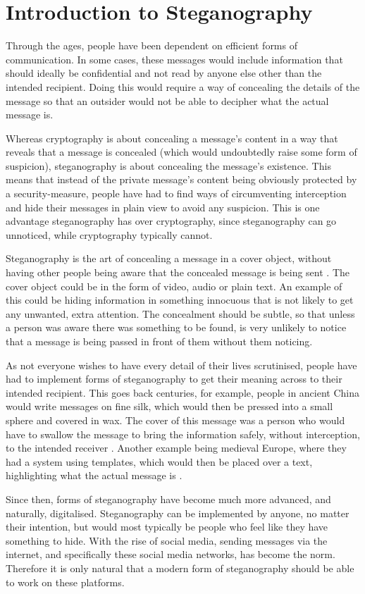 \section{Introduction to Steganography}
Through the ages, people have been dependent on efficient forms of communication. 
In some cases, these messages would include information that should ideally be confidential and not read by anyone else other than the intended recipient.
Doing this would require a way of concealing the details of the message so that an outsider would not be able to decipher what the actual message is.

Whereas cryptography is about concealing a message's content in a way that reveals that a message is concealed (which would undoubtedly raise some form of suspicion), steganography is about concealing the message's existence.
This means that instead of the private message's content being obviously protected by a security-measure, people have had to find ways of circumventing interception and hide their messages in plain view to avoid any suspicion.
This is one advantage steganography has over cryptography, since steganography can go unnoticed, while cryptography typically cannot. 

Steganography is the art of concealing a message in a cover object, without having other people being aware that the concealed message is being sent \citep{Anderson1998}.
The cover object could be in the form of video, audio or plain text.
An example of this could be hiding information in something innocuous that is not likely to get any unwanted, extra attention.
The concealment should be subtle, so that unless a person was aware there was something to be found, is very unlikely to notice that a message is being passed in front of them without them noticing.

As not everyone wishes to have every detail of their lives scrutinised, people have had to implement forms of steganography to get their meaning across to their intended recipient.
This goes back centuries, for example, people in ancient China would write messages on fine silk, which would then be pressed into a small sphere and covered in wax.
The cover of this message was a person who would have to swallow the message to bring the information safely, without interception, to the intended receiver \citep{Singh2001}.
Another example being medieval Europe, where they had a system using templates, which would then be placed over a text, highlighting what the actual message is \citep{Anderson1998}.

Since then, forms of steganography have become much more advanced, and naturally, digitalised.
Steganography can be implemented by anyone, no matter their intention, but would most typically be people who feel like they have something to hide.
With the rise of social media, sending messages via the internet, and specifically these social media networks, has become the norm.
Therefore it is only natural that a modern form of steganography should be able to work on these platforms. 